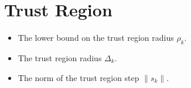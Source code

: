 \documentclass[letterpaper,10pt,english]{sphinxmanual}
\begin{document}
\section{Trust Region}
\label{\detokenize{diagnostic:trust-region}}\begin{itemize}
\item {} 
 \sphinxhyphen{} The lower bound on the trust region radius \(\rho_k\).

\item {} 
 \sphinxhyphen{} The trust region radius \(\Delta_k\).

\item {} 
 \sphinxhyphen{} The norm of the trust region step \(\|s_k\|\).

\end{itemize}
\end{document}
